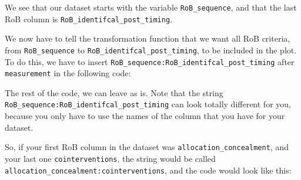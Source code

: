 \documentclass[]{book}
\newenvironment{Shaded}{\begin{snugshade}}{\end{snugshade}}
\newcommand{\KeywordTok}[1]{\textcolor[rgb]{0.13,0.29,0.53}{\textbf{#1}}}
\newcommand{\DataTypeTok}[1]{\textcolor[rgb]{0.13,0.29,0.53}{#1}}
\newcommand{\DecValTok}[1]{\textcolor[rgb]{0.00,0.00,0.81}{#1}}
\newcommand{\StringTok}[1]{\textcolor[rgb]{0.31,0.60,0.02}{#1}}
\newcommand{\OtherTok}[1]{\textcolor[rgb]{0.56,0.35,0.01}{#1}}
\newcommand{\OperatorTok}[1]{\textcolor[rgb]{0.81,0.36,0.00}{\textbf{#1}}}
\newcommand{\NormalTok}[1]{#1}
\theoremstyle{definition}
\theoremstyle{definition}
\theoremstyle{definition}
\theoremstyle{remark}
\begin{document}
We see that our dataset starts with the variable \texttt{RoB\_sequence},
and that the last RoB column is \texttt{RoB\_identifcal\_post\_timing}.

We now have to tell the transformation function that we want all RoB
criteria, from \texttt{RoB\_sequence} to
\texttt{RoB\_identifcal\_post\_timing}, to be included in the plot. To
do this, we have to insert
\texttt{RoB\_sequence:RoB\_identifcal\_post\_timing} after
\texttt{measurement} in the following code:

\begin{Shaded}
\end{Shaded}

The rest of the code, we can leave as is. Note that the string
\texttt{RoB\_sequence:RoB\_identifcal\_post\_timing} can look totally
different for you, because you only have to use the names of the column
that you have for your dataset.

So, if your first RoB column in the dataset was
\texttt{allocation\_concealment}, and your last one
\texttt{cointerventions}, the string would be called
\texttt{allocation\_concealment:cointerventions}, and the code would
look like this:

\begin{Shaded}
\end{Shaded}
\end{document}
